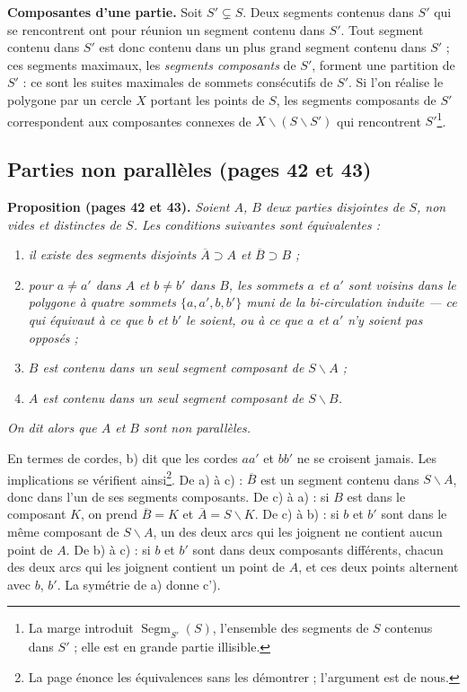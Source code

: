 \documentclass[11pt,a4paper]{article}
\begin{document}
\textbf{Composantes d'une partie.} Soit $S' \subsetneq S$. Deux segments
contenus dans $S'$ qui se rencontrent ont pour réunion un segment contenu
dans $S'$. Tout segment contenu dans $S'$ est donc contenu dans un plus grand
segment contenu dans $S'$ ; ces segments maximaux, les \emph{segments
composants} de $S'$, forment une partition de $S'$ : ce sont les suites
maximales de sommets consécutifs de $S'$. Si l'on réalise le polygone par un
cercle $X$ portant les points de $S$, les segments composants de $S'$
correspondent aux composantes connexes de $X \smallsetminus (S \smallsetminus
S')$ qui rencontrent $S'$\footnote{La marge introduit
$\operatorname{Segm}_{S'}(S)$, l'ensemble des segments de $S$ contenus dans
$S'$ ; elle est en grande partie illisible.}.

\subsection*{Parties non parallèles (pages 42 et 43)}

\textbf{Proposition (pages 42 et 43).} \emph{Soient $A$, $B$ deux parties
disjointes de $S$, non vides et distinctes de $S$. Les conditions suivantes
sont équivalentes :}
\begin{enumerate}
  \item[a)] \emph{il existe des segments disjoints $\overline{A} \supset A$ et
  $\overline{B} \supset B$ ;}
  \item[b)] \emph{pour $a \neq a'$ dans $A$ et $b \neq b'$ dans $B$, les
  sommets $a$ et $a'$ sont voisins dans le polygone à quatre sommets $\{a, a',
  b, b'\}$ muni de la bi-circulation induite --- ce qui équivaut à ce que $b$
  et $b'$ le soient, ou à ce que $a$ et $a'$ n'y soient pas opposés ;}
  \item[c)] \emph{$B$ est contenu dans un seul segment composant de $S
  \smallsetminus A$ ;}
  \item[c')] \emph{$A$ est contenu dans un seul segment composant de $S
  \smallsetminus B$.}
\end{enumerate}
\emph{On dit alors que $A$ et $B$ sont non parallèles.}

En termes de cordes, b) dit que les cordes $aa'$ et $bb'$ ne se croisent
jamais. Les implications se vérifient ainsi\footnote{La page énonce les
équivalences sans les démontrer ; l'argument est de nous.}. De a) à c) :
$\overline{B}$ est un segment contenu dans $S \smallsetminus A$, donc dans
l'un de ses segments composants. De c) à a) : si $B$ est dans le composant
$K$, on prend $\overline{B} = K$ et $\overline{A} = S \smallsetminus K$. De c)
à b) : si $b$ et $b'$ sont dans le même composant de $S \smallsetminus A$, un
des deux arcs qui les joignent ne contient aucun point de $A$. De b) à c) :
si $b$ et $b'$ sont dans deux composants différents, chacun des deux arcs
qui les joignent contient un point de $A$, et ces deux points alternent avec
$b$, $b'$. La symétrie de a) donne c').
\end{document}
